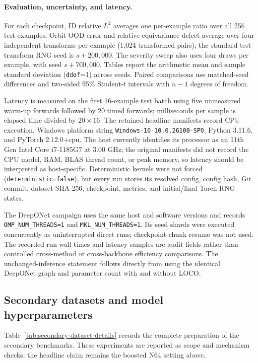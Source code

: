 \paragraph{Evaluation, uncertainty, and latency.}
For each checkpoint, ID relative \(L^2\) averages one per-example ratio over all
256 test examples.  Orbit OOD error and relative equivariance defect average over
four independent transforms per example (1,024 transformed pairs); the standard
test transform RNG seed is \(s+200{,}000\).  The severity sweep also uses four
draws per example, with seed \(s+700{,}000\).  Tables report the arithmetic mean and
sample standard deviation (\texttt{ddof}=1) across seeds.  Paired comparisons use
matched-seed differences and two-sided 95\% Student-\(t\) intervals with
\(n-1\) degrees of freedom.

Latency is measured on the first 16-example test batch using five unmeasured warm-up
forwards followed by 20 timed forwards; milliseconds per sample is elapsed time
divided by \(20\times16\).  The retained headline manifests record CPU execution,
Windows platform string \texttt{Windows-10-10.0.26100-SP0}, Python 3.11.6, and
PyTorch 2.12.0+cpu.  The host currently identifies its processor as an 11th Gen
Intel Core i7-1185G7 at 3.00 GHz; the original manifests did not record the CPU model,
RAM, BLAS thread count, or peak memory, so latency should be interpreted as
host-specific.  Deterministic kernels were not forced
(\texttt{deterministic=false}), but every run stores its resolved config, config
hash, Git commit, dataset SHA-256, checkpoint, metrics, and initial/final Torch RNG
states.

The DeepONet campaign uses the same host and software versions and records
\texttt{OMP\_NUM\_THREADS=1} and \texttt{MKL\_NUM\_THREADS=1}.  Its seed shards
were executed concurrently as uninterrupted direct runs; checkpoint-chunk resume
was not used.  The recorded run wall times and latency samples
are audit fields rather than controlled cross-method or cross-backbone efficiency
comparisons.  The unchanged-inference statement follows directly from using the
identical DeepONet graph and parameter count with and without LOCO.

\subsection{Secondary datasets and model hyperparameters}

Table~\ref{tab:secondary-dataset-details} records the complete preparation of the
secondary benchmarks.  These experiments are reported as scope and mechanism
checks; the headline claim remains the boosted N64 setting above.

